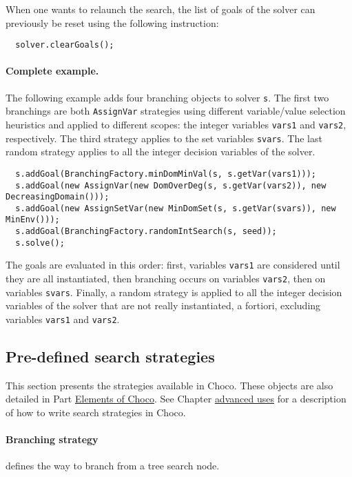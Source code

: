 When one wants to relaunch the search, the list of goals of the solver can previously be reset using the following instruction:
\begin{lstlisting}
  solver.clearGoals();
\end{lstlisting} 

\paragraph{Complete example.}
The following example adds four branching objects to solver \texttt{s}. 
The first two branchings are both \texttt{AssignVar} strategies using different variable/value selection heuristics and applied to different scopes: the integer variables \texttt{vars1} and \texttt{vars2}, respectively. The third strategy applies to the set variables \texttt{svars}. The last random strategy applies to all the integer decision variables of the solver.
\begin{lstlisting}
  s.addGoal(BranchingFactory.minDomMinVal(s, s.getVar(vars1)));
  s.addGoal(new AssignVar(new DomOverDeg(s, s.getVar(vars2)), new DecreasingDomain()));
  s.addGoal(new AssignSetVar(new MinDomSet(s, s.getVar(svars)), new MinEnv()));
  s.addGoal(BranchingFactory.randomIntSearch(s, seed));
  s.solve();
\end{lstlisting}
The goals are evaluated in this order: first, variables \texttt{vars1} are considered until they are all instantiated, then branching occurs on variables \texttt{vars2}, then on variables \texttt{svars}. Finally, a random strategy is applied to all the integer decision variables of the solver that are not really instantiated, a fortiori, excluding variables \texttt{vars1} and \texttt{vars2}.

\subsection{Pre-defined search strategies}\label{solver:predefinedsearchstrategy}\hypertarget{solver:predefinedsearchstrategy}{}

This section presents the strategies available in Choco. These objects are also detailed in Part \hyperlink{part:elements}{Elements of Choco}.
See Chapter \hyperlink{advanced}{advanced uses} for a description of how to write search strategies in Choco.

\paragraph{Branching strategy}\label{solver:branchstrat}\hypertarget{solver:branchstrat}{}
defines the way to branch from a tree search node.
  
